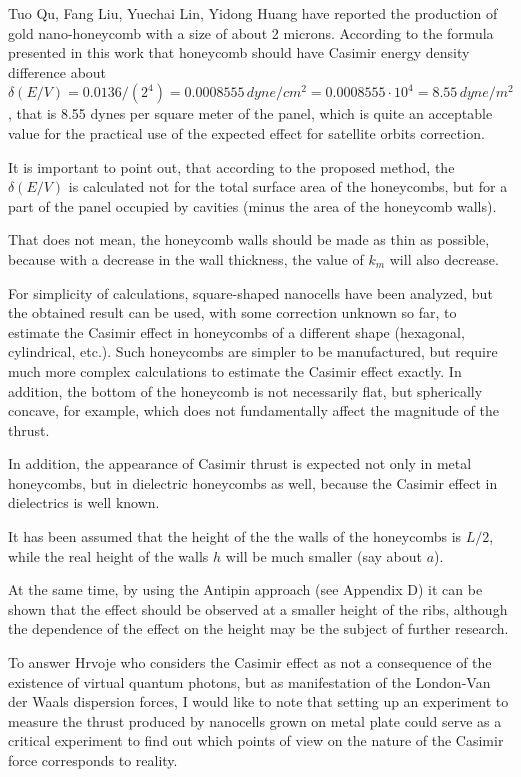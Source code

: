 \documentclass[twoside, 10pt, ptm]{article}
\begin{document}
\begin{multicols}{2}
    Tuo Qu, Fang Liu, Yuechai Lin, Yidong Huang \cite{Tuo2019} have reported
the production of gold nano-honeycomb with a size of about 2
microns. According to the formula presented in this work that honeycomb should
have Casimir energy density difference about
\(\delta\left(E/V\right) = 0.0136/({2^4}) = 0.0008555\,dyne/cm^2 = 0.0008555 \cdot 10^4 = 8.55\,dyne/m^2\),
that is 8.55 dynes per square meter of the panel, which is quite
an acceptable value for the practical use of the expected effect for
satellite orbits correction.

    It is important to point out, that according to the proposed method,
the \(\delta\left(E/V\right)\) is
calculated not for the total surface area of the honeycombs, but for a
part of the panel occupied by cavities (minus the area of the
honeycomb walls).

    That does not mean, the honeycomb walls should be made as thin
as possible, because with a decrease in the wall thickness, the value of
\(k_m\) will also decrease.

    For simplicity of calculations, square-shaped nanocells have been analyzed,
but the obtained result can be used, with some correction unknown so far,
to estimate the Casimir effect in honeycombs of a different shape
(hexagonal, cylindrical, etc.). Such honeycombs are simpler to be manufactured,
but require much more complex calculations to estimate the Casimir effect exactly.
In addition, the bottom of the honeycomb is not necessarily flat, but
spherically concave, for example, which does not fundamentally affect
the magnitude of the thrust.

    In addition, the appearance of Casimir thrust is expected not only in metal honeycombs,
but in dielectric honeycombs as well, because the Casimir effect in dielectrics
is well known.

    It has been assumed that the height of the the walls of the honeycombs is \(L/2\),
while the real height of the walls \(h\) will be much smaller (say about \(a\)).

    At the same time, by using the Antipin approach (see Appendix D) it can be
shown that the effect should be observed at a smaller height of the
ribs, although the dependence of the effect on the height may be the
subject of further research.

    To answer Hrvoje \cite{Hrvoje2016} who considers the Casimir
effect as not a consequence of the existence of virtual quantum photons,
but as manifestation of the London-Van der Waals dispersion
forces, I would like to note that setting up an experiment to measure the thrust
produced by nanocells grown on metal plate could serve as a critical
experiment to find out which points of view on the nature of the
Casimir force corresponds to reality.

\end{multicols}
\end{document}
